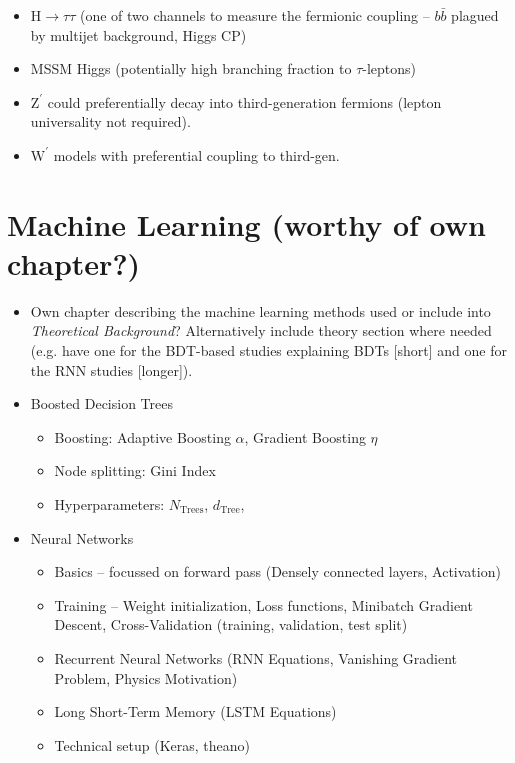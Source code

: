 \begin{itemize}
\begin{itemize}
\begin{itemize}
  \item $\mathrm{H} \rightarrow \tau \tau$ (one of two channels to measure
    the fermionic coupling -- $b \bar{b}$ plagued by multijet background,
    Higgs CP)

  \item MSSM Higgs (potentially high branching fraction to $\tau$-leptons)

  \item $\mathrm{Z}^\prime$ could preferentially decay into third-generation
    fermions (lepton universality not required).

  \item $\mathrm{W}^\prime$ models with preferential coupling to third-gen.
  \end{itemize}
\end{itemize}

\end{itemize}

\section{Machine Learning (worthy of own chapter?)}

\begin{itemize}
\item Own chapter describing the machine learning methods used or include into
  \textit{Theoretical Background}? Alternatively include theory section where
  needed (e.g. have one for the BDT-based studies explaining BDTs [short] and
  one for the RNN studies [longer]).

\item Boosted Decision Trees
  \begin{itemize}
  \item Boosting: Adaptive Boosting $\alpha$, Gradient Boosting $\eta$
  \item Node splitting: Gini Index
  \item Hyperparameters: $N_\mathrm{Trees}$, $d_\mathrm{Tree}$,
  \end{itemize}

\item Neural Networks
  \begin{itemize}
  \item Basics -- focussed on forward pass (Densely connected layers, Activation)
  \item Training -- Weight initialization, Loss functions, Minibatch Gradient
    Descent, Cross-Validation (training, validation, test split)
  \item Recurrent Neural Networks (RNN Equations, Vanishing Gradient Problem,
    Physics Motivation)
  \item Long Short-Term Memory \cite{lstm} (LSTM Equations)
  \item Technical setup (Keras, theano)
  \end{itemize}
\end{itemize}

